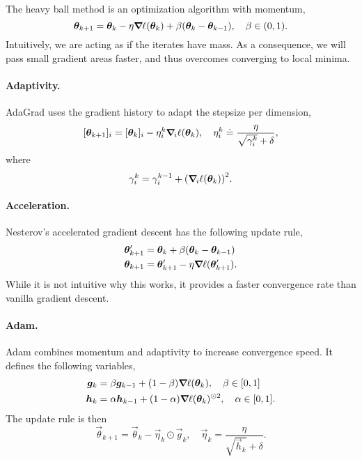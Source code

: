 The heavy ball method is an optimization algorithm with momentum, \[
    \vec{\theta}_{k+1} = \vec{\theta}_k - \eta \grad{\ell(\vec{\theta}_k)}{} + \beta (\vec{\theta}_k - \vec{\theta}_{k-1}), \quad \beta \in (0,1).
\]
Intuitively, we are acting as if the iterates have mass. As a consequence, we will pass small
gradient areas faster, and thus overcomes converging to local minima.

\paragraph{Adaptivity.}

AdaGrad uses the gradient history to adapt the stepsize per dimension, \[
    [\vec{\theta}_{k+1}]_i = [\vec{\theta}_k]_i - \eta_i^k \grad{\ell(\vec{\theta}_k)}{i}, \quad \eta_i^k \doteq \frac{\eta}{\sqrt{\gamma_i^k} + \delta},
\]
where \[
    \gamma_i^k = \gamma_i^{k-1} + \lft( \grad{\ell(\vec{\theta}_k)}{i} \rgt)^2.
\]

\paragraph{Acceleration.}

Nesterov's accelerated gradient descent has the following update rule,
\begin{align*}
    \vec{\theta}_{k+1}' & = \vec{\theta}_k + \beta (\vec{\theta}_k - \vec{\theta}_{k-1})   \\
    \vec{\theta}_{k+1}  & = \vec{\theta}_{k+1}' - \eta \grad{\ell(\vec{\theta}_{k+1}')}{}.
\end{align*}
While it is not intuitive why this works, it provides a faster convergence rate than vanilla gradient
descent.

\paragraph{Adam.}

Adam combines momentum and adaptivity to increase convergence speed. It defines the following
variables,
\begin{align*}
    \vec{g}_k & = \beta \vec{g}_{k-1} + (1- \beta) \grad{\ell(\vec{\theta}_k)}{}, \quad \beta \in [0,1]              \\
    \vec{h}_k & = \alpha \vec{h}_{k-1} + (1-\alpha) \grad{\ell(\vec{\theta}_k)}{}^{\odot 2}, \quad \alpha \in [0,1].
\end{align*}
The update rule is then \[
    \vec{\theta}_{k+1} = \vec{\theta}_k - \vec{\eta}_k \odot \vec{g}_k, \quad \vec{\eta}_k = \frac{\eta}{\sqrt{\vec{h}_k} + \delta}.
\]

